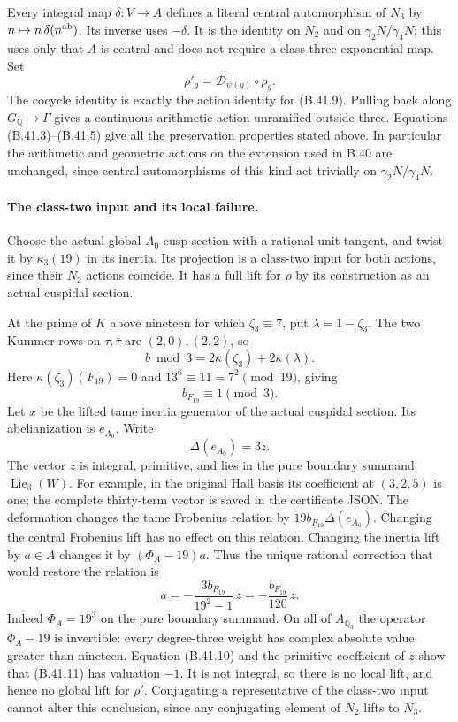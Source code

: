 Every integral map $\delta:V\to A$ defines a literal central
automorphism of $N_3$ by $n\mapsto n\,\delta(n^{\rm ab})$.
Its inverse uses $-\delta$.  It is the identity on $N_2$
and on $\gamma_2N/\gamma_4N$; this uses only that $A$ is
central and does not require a class-three exponential map.
Set
\[
 \rho'_g=\mathcal D_{\psi(g)}\circ\rho_g.                 \tag{B.41.9}
\]
The cocycle identity is exactly the action identity for
(B.41.9).  Pulling back along $G_{\mathbb Q}\to\Gamma$
gives a continuous arithmetic action unramified outside
three.  Equations (B.41.3)--(B.41.5) give all the preservation
properties stated above.  In particular the arithmetic
and geometric actions on the extension used in B.40 are
unchanged, since central automorphisms of this kind act
trivially on $\gamma_2N/\gamma_4N$.

\paragraph{The class-two input and its local failure.}
Choose the actual global $A_0$ cusp section with a rational
unit tangent, and twist it by $\kappa_3(19)$ in its inertia.
Its projection is a class-two input for both actions, since
their $N_2$ actions coincide.  It has a full lift for $\rho$
by its construction as an actual cuspidal section.

At the prime of $K$ above nineteen for which
$\zeta_3\equiv7$, put $\lambda=1-\zeta_3$.  The two
Kummer rows on $\tau,\bar\tau$ are $(2,0),(2,2)$, so
\[
 b\bmod3=2\kappa(\zeta_3)+2\kappa(\lambda).
\]
Here $\kappa(\zeta_3)(F_{19})=0$ and
$13^6\equiv11=7^2\pmod {19}$, giving
\[
 b_{F_{19}}\equiv1\pmod3.                                 \tag{B.41.10}
\]
Let $x$ be the lifted tame inertia generator of the actual
cuspidal section.  Its abelianization is $e_{A_0}$.  Write
\[
 \Delta(e_{A_0})=3z.
\]
The vector $z$ is integral, primitive, and lies in the pure
boundary summand $\operatorname{Lie}_3(W)$.  For example,
in the original Hall basis its coefficient at $(3,2,5)$
is one; the complete thirty-term vector is saved in the
certificate JSON.  The deformation changes the tame
Frobenius relation by $19b_{F_{19}}\Delta(e_{A_0})$.
Changing the central Frobenius lift has no effect on this
relation.  Changing the inertia lift by $a\in A$ changes
it by $(\Phi_A-19)a$.  Thus the unique rational correction
that would restore the relation is
\[
 a=-\frac{3b_{F_{19}}}{19^2-1}\,z
   =-\frac{b_{F_{19}}}{120}\,z.                            \tag{B.41.11}
\]
Indeed $\Phi_A=19^3$ on the pure boundary summand.
On all of $A_{\mathbb Q_3}$ the operator
$\Phi_A-19$ is invertible: every degree-three weight has
complex absolute value greater than nineteen.
Equation (B.41.10) and the primitive coefficient of $z$
show that (B.41.11) has valuation $-1$.  It is not integral,
so there is no local lift, and hence no global lift for
$\rho'$.  Conjugating a representative of the class-two
input cannot alter this conclusion, since any conjugating
element of $N_2$ lifts to $N_3$.


